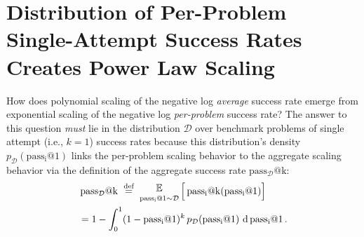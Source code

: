 
\section{Distribution of Per-Problem Single-Attempt Success Rates Creates Power Law Scaling}
\label{sec:distr_per_problem_success_rates}

How does polynomial scaling of the negative log \textit{average} success rate emerge from exponential scaling of the negative log \textit{per-problem} success rate?
The answer to this question \textit{must} lie in the distribution $\mathcal{D}$ over benchmark problems of single attempt (i.e., $k=1$) success rates because this distribution's density $p_{\mathcal{D}}(\operatorname{pass_i@1})$ links the per-problem scaling behavior to the aggregate scaling behavior via the definition of the aggregate success rate $\operatorname{pass_{\mathcal{D}}@k}$:
%
\begin{equation}
\begin{aligned}
    &\operatorname{pass_{\mathcal{D}}@k} \; \defeq \; \mathop{\raisebox{3pt}{$\mathbb{E}$}}_{\operatorname{pass_i@1} \sim \mathcal{D}} \Big[\operatorname{pass_i@k}(\operatorname{pass_i@1}) \Big]\\
    &= 1 - \int_0^1 (1 - \operatorname{pass_i@1})^k \, p_{\mathcal{D}}(\operatorname{pass_i@1}) \, \operatorname{d\,pass_i@1}.
\end{aligned}
\end{equation}


